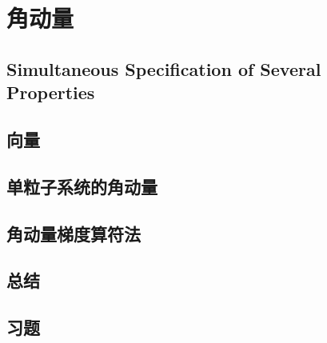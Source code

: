 \chapter{角动量}
\section{Simultaneous Specification of Several Properties}

\section{向量}

\section{单粒子系统的角动量}

\section{角动量梯度算符法}

\section*{总结}

\section*{习题}